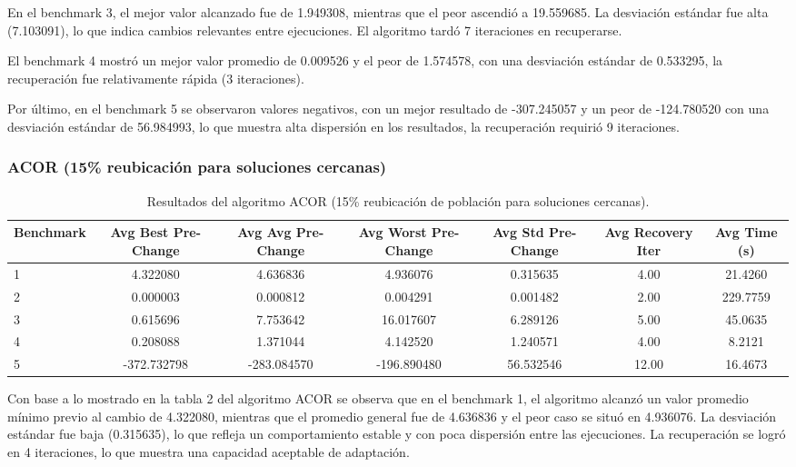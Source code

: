\documentclass[10pt]{article}
\begin{document}
En el benchmark 3, el mejor valor alcanzado fue de 1.949308, mientras que el peor ascendió a 19.559685. La desviación estándar fue alta (7.103091), lo que indica cambios relevantes entre ejecuciones. El algoritmo tardó 7 iteraciones en recuperarse.

El benchmark 4 mostró un mejor valor promedio de 0.009526 y el peor de 1.574578, con una desviación estándar de 0.533295,  la recuperación fue relativamente rápida (3 iteraciones).

Por último, en el benchmark 5 se observaron valores negativos, con un mejor resultado de -307.245057 y un peor de -124.780520 con una desviación estándar de 56.984993, lo que muestra alta dispersión en los resultados, la recuperación requirió 9 iteraciones.

\subsubsection*{ACOR (15\% reubicación para soluciones cercanas)}
\begin{table}[H]
\centering
\caption{Resultados del algoritmo ACOR (15\% reubicación de población para soluciones cercanas).}
\label{tab:acor}
\scriptsize
\begin{tabular}{lcccccc}
\toprule
\textbf{Benchmark} & \textbf{Avg Best Pre-Change} & \textbf{Avg Avg Pre-Change} & \textbf{Avg Worst Pre-Change} & \textbf{Avg Std Pre-Change} & \textbf{Avg Recovery Iter} & \textbf{Avg Time (s)} \\
\midrule
1 & 4.322080 & 4.636836 & 4.936076 & 0.315635 & 4.00 & 21.4260 \\
2 & 0.000003 & 0.000812 & 0.004291 & 0.001482 & 2.00 & 229.7759 \\
3 & 0.615696 & 7.753642 & 16.017607 & 6.289126 & 5.00 & 45.0635 \\
4 & 0.208088 & 1.371044 & 4.142520 & 1.240571 & 4.00 & 8.2121 \\
5 & -372.732798 & -283.084570 & -196.890480 & 56.532546 & 12.00 & 16.4673 \\
\bottomrule
\end{tabular}
\end{table}

Con base a lo mostrado en la tabla 2 del algoritmo ACOR se observa que en el benchmark 1, el algoritmo alcanzó un valor promedio mínimo previo al cambio de 4.322080, mientras que el promedio general fue de 4.636836 y el peor caso se situó en 4.936076. La desviación estándar fue baja (0.315635), lo que refleja un comportamiento estable y con poca dispersión entre las ejecuciones. La recuperación se logró en 4 iteraciones, lo que muestra una capacidad aceptable de adaptación.
\end{document}

